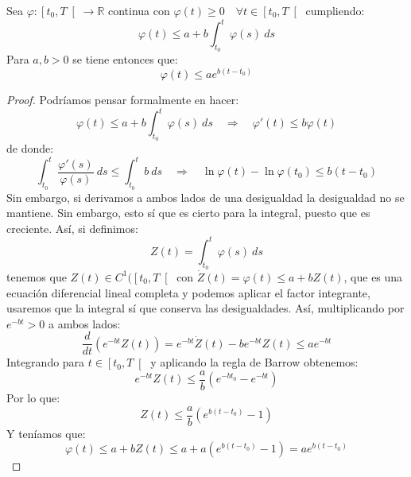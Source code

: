 \begin{lema}[de Gronwall]
    Sea $\varphi:\left[t_0,T\right[\to \mathbb{R}$ continua con $\varphi(t)\geq 0 \quad \forall t\in \left[t_0,T\right[$ cumpliendo:
    \begin{equation*}
        \varphi(t) \leq a + b \int_{t_0}^{t} \varphi(s)~ds 
    \end{equation*}
    Para $a,b>0$ se tiene entonces que:
    \begin{equation*}
        \varphi(t) \leq a e^{b(t-t_0)}
    \end{equation*}
    \begin{proof}
        Podríamos pensar formalmente en hacer:
        \begin{equation*}
            \varphi(t)\leq a + b\int_{t_0}^{t} \varphi(s)~ds  \quad\Longrightarrow\quad \varphi'(t) \leq b\varphi(t)
        \end{equation*}
        de donde:
        \begin{equation*}
            \int_{t_0}^{t} \frac{\varphi'(s)}{\varphi(s)}~ds \leq \int_{t_0}^{t} b~ds  \quad\Longrightarrow\quad \ln\varphi(t) - \ln\varphi(t_0) \leq b(t-t_0)
        \end{equation*}
        Sin embargo, si derivamos a ambos lados de una desigualdad la desigualdad no se mantiene. Sin embargo, esto sí que es cierto para la integral, puesto que es creciente. Así, si definimos:
        \begin{equation*}
            Z(t) = \int_{t_0}^{t} \varphi(s)~ds 
        \end{equation*}
        tenemos que $Z(t)\in C^1(\left[t_0,T\right[$ con $\dot{Z}(t) = \varphi(t) \leq a + bZ(t)$, que es una ecuación diferencial lineal completa y podemos aplicar el factor integrante, usaremos que la integral sí que conserva las desigualdades. Así, multiplicando por $e^{-bt}>0$ a ambos lados:
        \begin{equation*}
            \frac{d}{dt}(e^{-bt}Z(t)) = e^{-bt}\dot{Z}(t) - be^{-bt}Z(t) \leq ae^{-bt}
        \end{equation*}
        Integrando para $t\in \left[t_0,T\right[$ y aplicando la regla de Barrow obtenemos:
        \begin{equation*}
            e^{-bt}Z(t) \leq \frac{a}{b}(e^{-bt_0} - e^{-bt})
        \end{equation*}
        Por lo que:
        \begin{equation*}
            Z(t) \leq \frac{a}{b}(e^{b(t-t_0)}-1)
        \end{equation*}
        Y teníamos que:
        \begin{equation*}
            \varphi(t) \leq a +bZ(t) \leq a + a(e^{b(t-t_0)}-1) = ae^{b(t-t_0)}
        \end{equation*}
    \end{proof}
\end{lema}

